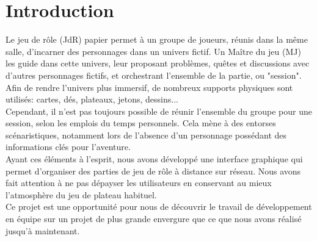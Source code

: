 \section{Introduction}

Le jeu de rôle (JdR) papier permet à un groupe de joueurs, réunis dans la même salle, d'incarner des personnages dans un univers fictif. Un Maître du jeu (MJ) les guide dans cette univers, leur proposant problèmes, quêtes et discussions avec d'autres personnages fictifs, et orchestrant l'ensemble de la partie, ou "session". Afin de rendre l'univers plus immersif, de nombreux supports physiques sont utilisés: cartes, dés, plateaux, jetons, dessins...\\
Cependant, il n'est pas toujours possible de réunir l'ensemble du groupe pour une session, selon les emplois du temps personnels. Cela mène à des entorses scénaristiques, notamment lors de l’absence d'un personnage possédant des informations clés pour l'aventure.\\

Ayant ces éléments à l'esprit, nous avons développé une interface graphique qui permet d'organiser des parties de jeu de rôle à distance sur réseau. Nous avons fait attention à ne pas dépayser les utilisateurs en conservant au mieux l'atmosphère du jeu de plateau habituel.\\

Ce projet est une opportunité pour nous de découvrir le travail de développement en équipe sur un projet de plus grande envergure que ce que nous avons réalisé jusqu'à maintenant.	